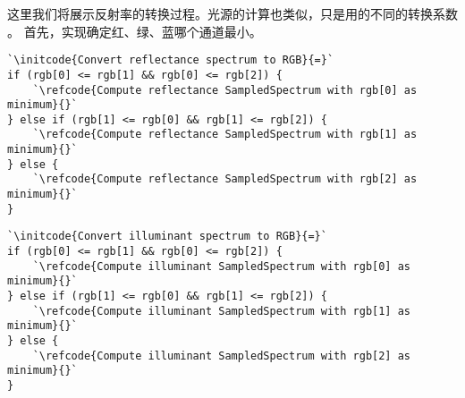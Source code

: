 这里我们将展示反射率的转换过程。光源的计算也类似，只是用的不同的转换系数
。
首先，实现确定红、绿、蓝哪个通道最小。
\begin{lstlisting}
`\initcode{Convert reflectance spectrum to RGB}{=}`
if (rgb[0] <= rgb[1] && rgb[0] <= rgb[2]) {
    `\refcode{Compute reflectance SampledSpectrum with rgb[0] as minimum}{}`
} else if (rgb[1] <= rgb[0] && rgb[1] <= rgb[2]) {
    `\refcode{Compute reflectance SampledSpectrum with rgb[1] as minimum}{}`
} else {
    `\refcode{Compute reflectance SampledSpectrum with rgb[2] as minimum}{}`
}
\end{lstlisting}
\begin{lstlisting}
`\initcode{Convert illuminant spectrum to RGB}{=}`
if (rgb[0] <= rgb[1] && rgb[0] <= rgb[2]) {
    `\refcode{Compute illuminant SampledSpectrum with rgb[0] as minimum}{}`
} else if (rgb[1] <= rgb[0] && rgb[1] <= rgb[2]) {
    `\refcode{Compute illuminant SampledSpectrum with rgb[1] as minimum}{}`
} else {
    `\refcode{Compute illuminant SampledSpectrum with rgb[2] as minimum}{}`
}
\end{lstlisting}

